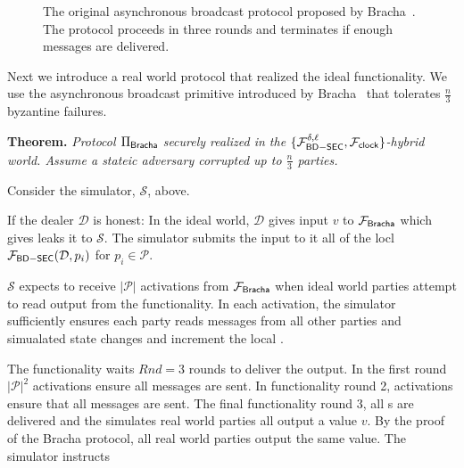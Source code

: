 \begin{figure}
	
	\label{fig:protocol:asyncbracha}
	\caption{The original asynchronous broadcast protocol proposed by Bracha~\cite{bracha-broadcast}. The protocol proceeds in three rounds and terminates if enough messages are delivered.}
\end{figure}

Next we introduce a real world protocol that realized the ideal functionality.
We use the asynchronous broadcast primitive introduced by Bracha~\cite{bracha-broadcast} that tolerates $\frac{n}{3}$ byzantine failures.

\begin{figure}[!h]
	
\end{figure}
\begin{figure}
	
\end{figure}

{\bf Theorem.} {\em Protocol $\Pi_{{\mathsf {Bracha}}}$ securely realized \Fbc in the $\{\mathcal{F}_{{\mathsf {BD-SEC}}}^{\delta,\ell},\mathcal{F}_{{\mathsf {clock}}} \}$-hybrid world. Assume a stateic adversary corrupted up to $\frac{n}{3}$ parties.}

Consider the simulator, $\mathcal{S}$, above.

If the dealer $\mathcal{D}$ is honest: In the ideal world, $\mathcal{D}$ gives input $v$ to $\mathcal{F}_{{\mathsf {Bracha}}}$ which gives leaks it to $\mathcal{S}$.
The simulator submits the input to it all of the locl $\mathcal{F}_{{\mathsf {BD-SEC}}}(\mathcal{D},p_i)$ for $p_i \in  \mathcal{P}$.

$\mathcal{S}$ expects to receive $|\mathcal{P}|$ activations from $\mathcal{F}_{{\mathsf {Bracha}}}$ when ideal world parties attempt to read output from the functionality.
In each activation, the simulator sufficiently ensures each party reads messages from all other parties and simualated state changes and increment the local \Fclock.

The functionality waits $Rnd = 3$ rounds to deliver the output. In the first round $|\mathcal{P}|^2$ activations ensure all  messages are sent.
In functionality round 2, activations ensure that all  messages are sent. The final functionality round 3, all s are delivered and the simulates real world parties all output a value $v$.
By the proof of the Bracha protocol, all real world parties output the same value. The simulator instructs 


